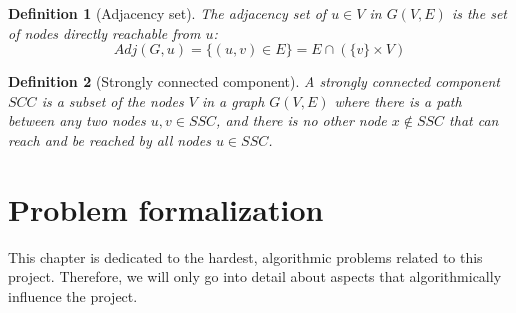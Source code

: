 \documentclass{report}[a4paper]
\newtheorem{definition}{Definition}[section]
\newtheorem{theorem}{Theorem}[section]
\theoremstyle{remark}
\begin{document}
\begin{definition}[Adjacency set]
    The adjacency set of $u \in V$ in $G(V,E)$ is the set of nodes directly reachable from $u$:
    \begin{equation*}
        Adj(G, u) = \{(u, v) \in E\} = E \cap (\{v\}\times V)
    \end{equation*}
\end{definition}
\begin{definition}[Strongly connected component]
    A strongly connected component $SCC$ is a subset of the nodes $V$ in a graph $G(V,E)$ where there is a path between any two nodes $u, v \in SSC$, and there is no other node $x \not \in SSC$ that can reach and be reached by all nodes $u \in SSC$.
\end{definition}

\chapter{Problem formalization}
This chapter is dedicated to the hardest, algorithmic problems related to this project. Therefore, we will only go into detail about aspects that algorithmically influence the project.
\end{document}
